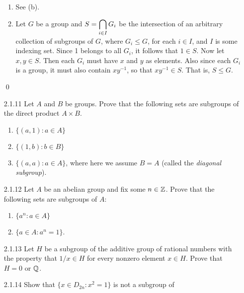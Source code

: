 \begin{enumerate}
      \begin{enumerate}
         \item See (b).
         \item Let $G$ be a group and $S = \displaystyle\bigcap_{i \in I}G_i$ be the
               intersection of an arbitrary collection of subgroups of $G$,
               where $G_i \le G$, for each $i \in I$, and $I$ is some indexing   
               set. Since 1 belongs to all $G_i$, it follows that $1 \in S$. Now
               let $x, y \in S$. Then each $G_i$ must have $x$ and $y$ as
               elements. Also since each $G_i$ is a group, it must also contain
               $xy^{-1}$, so that $xy^{-1} \in S$. That is, $S \le G$.
      \end{enumerate} \qed
   \item[2.1.11]  Let $A$ and $B$ be groups. Prove that the following sets are
                  subgroups of the direct product $A \times B$.
                  \begin{enumerate}
                     \item $\{(a, 1) : a \in A\}$
                     \item $\{(1, b) : b \in B\}$
                     \item $\{(a, a) : a \in A\}$, where here we assume $B = A$
                           (called the \textit{diagonal subgroup}).
                  \end{enumerate}
   \item[2.1.12]  Let $A$ be an abelian group and fix some $n \in \mathbb{Z}$. Prove
                  that the following sets are subgroups of $A$:
                  \begin{enumerate}
                     \item $\{a^n : a \in A\}$
                     \item $\{a \in A : a^n = 1\}$.
                  \end{enumerate}
   \item[2.1.13]  Let $H$ be a subgroup of the additive group of rational
                  numbers with the property that $1/x \in H$ for every nonzero
                  element $x \in H$. Prove that $H = 0$ or $\mathbb{Q}$.
   \item[2.1.14]  Show that $\{x \in D_{2n} : x^2 = 1\}$ is not a subgroup of

\end{enumerate}
